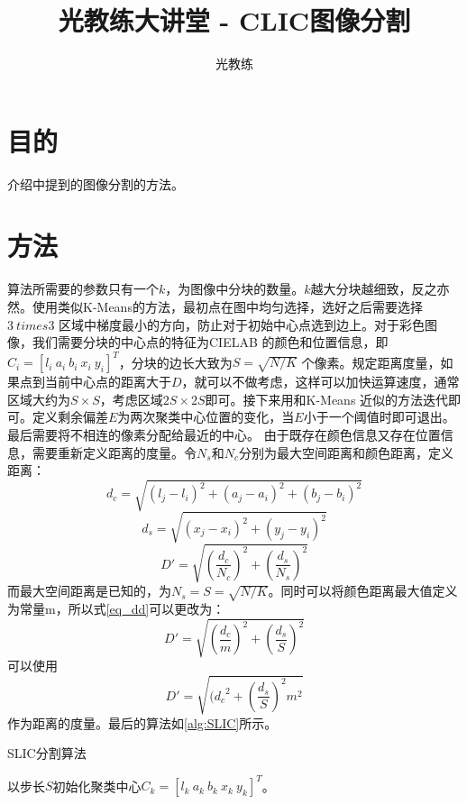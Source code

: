 \documentclass[11pt, a4paper]{article}
\begin{document}
\begin{CJK}{UTF8}{song}
\title{光教练大讲堂 - CLIC图像分割}
\author{光教练}
\maketitle
\section{目的}
介绍\cite{Bib_SLIC}中提到的图像分割的方法。
\section{方法}
算法所需要的参数只有一个$k$，为图像中分块的数量。$k$越大分块越细致，反之亦然。使用类似K-Means的方法，最初点在图中均匀选择，选好之后需要选择$3 \ times 3$ 区域中梯度最小的方向，防止对于初始中心点选到边上。对于彩色图像，我们需要分块的中心点的特征为CIELAB 的颜色和位置信息，即$C_i=[l_i\: a_i\: b_i\: x_i\: y_i]^T$，分块的边长大致为$S=\sqrt{N/K}$ 个像素。规定距离度量，如果点到当前中心点的距离大于$D$，就可以不做考虑，这样可以加快运算速度，通常区域大约为$S \times S$，考虑区域$2S \times 2S$即可。接下来用和K-Means 近似的方法迭代即可。定义剩余偏差$E$为两次聚类中心位置的变化，当$E$小于一个阈值时即可退出。最后需要将不相连的像素分配给最近的中心。
由于既存在颜色信息又存在位置信息，需要重新定义距离的度量。令$N_s$和$N_c$分别为最大空间距离和颜色距离，定义距离：
\begin{equation}
d_c=\sqrt{(l_j-l_i) ^ 2 + (a_j-a_i) ^ 2 + (b_j-b_i) ^ 2}
\end{equation}
\begin{equation}
d_s=\sqrt{(x_j-x_i) ^ 2 + (y_j-y_i) ^ 2}
\end{equation}
\begin{equation}\label{eq_dd}
D'=\sqrt{(\frac{d_c}{N_c}) ^ 2 + (\frac{d_s}{N_s}) ^ 2}
\end{equation}
而最大空间距离是已知的，为$N_s = S = \sqrt{N/K}$。同时可以将颜色距离最大值定义为常量m，所以式\ref{eq_dd}可以更改为：
\begin{equation}
D'=\sqrt{(\frac{d_c}{m}) ^ 2 + (\frac{d_s}{S}) ^ 2}
\end{equation}
可以使用
\begin{equation}
D'=\sqrt{({d_c} ^ 2 + (\frac{d_s}{S}) ^ 2 m^2}
\end{equation}
作为距离的度量。最后的算法如\ref{alg:SLIC}所示。
\begin{algorithm}
\caption{SLIC分割算法}
\label{alg:SLIC}
\begin{algorithmic}
\STATE 以步长$S$初始化聚类中心$C_k=[l_k\: a_k\: b_k\: x_k\: y_k]^T$。

\end{algorithmic}
\end{algorithm}
\end{CJK}
\end{document}
